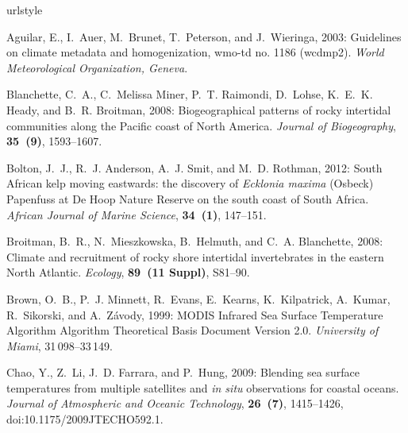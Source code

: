 \documentclass[twocol]{ametsoc}
\begin{document}
\begin{thebibliography}{41}
\providecommand{\natexlab}[1]{#1}
\providecommand{\url}[1]{\texttt{#1}}
\renewcommand{\UrlFont}{\rmfamily}
\providecommand{\urlprefix}{URL }
\expandafter\ifx\csname urlstyle\endcsname\relax
  \providecommand{\doi}[1]{doi:\discretionary{}{}{}#1}\else
  \providecommand{\doi}{doi:\discretionary{}{}{}\begingroup
  \urlstyle{rm}\Url}\fi
\providecommand{\eprint}[2][]{\url{#2}}

Aguilar, E., I.~Auer, M.~Brunet, T.~Peterson, and J.~Wieringa, 2003: Guidelines
  on climate metadata and homogenization, wmo-td no. 1186 (wcdmp2).
  \textit{World Meteorological Organization, Geneva}.

Blanchette, C.~A., C.~{Melissa Miner}, P.~T. Raimondi, D.~Lohse, K.~E.~K.
  Heady, and B.~R. Broitman, 2008: {Biogeographical patterns of rocky
  intertidal communities along the Pacific coast of North America}.
  \textit{Journal of Biogeography}, \textbf{35~(9)}, 1593--1607.

Bolton, J.~J., R.~J. Anderson, A.~J. Smit, and M.~D. Rothman, 2012: {South
  African kelp moving eastwards: the discovery of \textit{Ecklonia maxima} (Osbeck)
  Papenfuss at De Hoop Nature Reserve on the south coast of South Africa}.
  \textit{African Journal of Marine Science}, \textbf{34~(1)}, 147--151.

Broitman, B.~R., N.~Mieszkowska, B.~Helmuth, and C.~A. Blanchette, 2008:
  {Climate and recruitment of rocky shore intertidal invertebrates in the
  eastern North Atlantic.} \textit{Ecology}, \textbf{89~(11 Suppl)}, S81--90.

Brown, O.~B., P.~J. Minnett, R.~Evans, E.~Kearns, K.~Kilpatrick, A.~Kumar,
  R.~Sikorski, and A.~Z{\'{a}}vody, 1999: {MODIS Infrared Sea Surface
  Temperature Algorithm Algorithm Theoretical Basis Document Version 2.0}.
  \textit{University of Miami}, 31\,098--33\,149.

Chao, Y., Z.~Li, J.~D. Farrara, and P.~Hung, 2009: {Blending sea surface
  temperatures from multiple satellites and \textit{in situ} observations for coastal
  oceans}. \textit{Journal of Atmospheric and Oceanic Technology},
  \textbf{26~(7)}, 1415--1426, \doi{10.1175/2009JTECHO592.1}.


\end{thebibliography}
\end{document}
